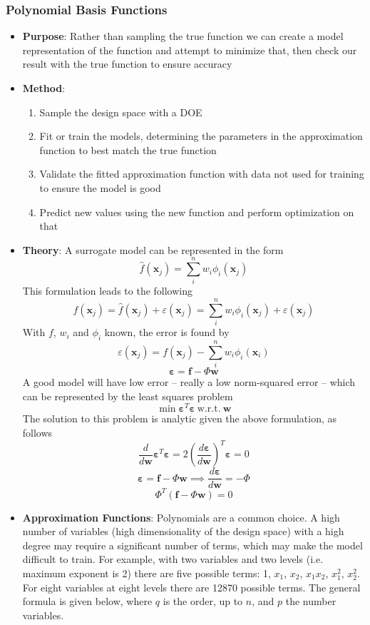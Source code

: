 \documentclass[12pt]{article}
\newcommand{\Item}[1]{\item \textbf{#1}:}
\newcommand{\CenteredBoxed}[1]{\begin{center}\boxed{#1}\end{center}}
\newcommand{\sumlim}[2]{\sum\limits_{#1}^{#2}}
\newcommand{\boldx}{\mathbf{x}}
\begin{document}
\subsubsection{Polynomial Basis Functions}
\begin{itemize}
\Item{Purpose} Rather than sampling the true function we can create a model representation of the function and attempt to minimize that, then check our result with the true function to ensure accuracy
\Item{Method}
	\begin{enumerate}
	\item Sample the design space with a DOE
	\item Fit or train the models, determining the parameters in the approximation function to best match the true function
	\item Validate the fitted approximation function with data not used for training to ensure the model is good
	\item Predict new values using the new function and perform optimization on that
	\end{enumerate}
\Item{Theory} A surrogate model can be represented in the form
$$\hat{f}(\boldx_j)=\sumlim{i}{n}w_i\phi_i(\boldx_j)$$
This formulation leads to the following
$$f(\boldx_j) = \hat{f}(\boldx_j) + \varepsilon(\boldx_j) = \sumlim{i}{n}w_i\phi_i(\boldx_j) + \varepsilon(\boldx_j)$$
With $f$, $w_i$ and $\phi_i$ known, the error is found by
$$\varepsilon(\boldx_j)=f(\boldx_j)-\sumlim{i}{n}w_i\phi_i(\boldx_i)$$
$$\bm{\varepsilon}=\bm{f}-\Phi\bm{w}$$
A good model will have low error -- really a low norm-squared error -- which can be represented by the least squares problem
$$\min\bm{\varepsilon}^T\bm{\varepsilon}\ \mathrm{w.r.t.}\ \bm{w}$$
The solution to this problem is analytic given the above formulation, as follows
$$\frac{d}{d\bm{w}}\bm{\varepsilon}^T\bm{\varepsilon} = 2\left(\frac{d\bm{\varepsilon}}{d\bm{w}}\right)^T\bm{\varepsilon}=0$$
$$\bm{\varepsilon}=\bm{f}-\Phi\bm{w}\implies \frac{d\bm{\varepsilon}}{d\bm{w}}=-\Phi$$
$$\Phi^T(\bm{f}-\Phi\bm{w})=0$$
\CenteredBoxed{\bm{w}=\left(\Phi^T\Phi\right)^{-1}\Phi^T\bm{f}}
\Item{Approximation Functions} Polynomials are a common choice. A high number of variables (high dimensionality of the design space) with a high degree may require a significant number of terms, which may make the model difficult to train. For example, with two variables and two levels (i.e. maximum exponent is 2) there are five possible terms: 1, $x_1$, $x_2$, $x_1x_2$, $x_1^2$, $x_2^2$. For eight variables at eight levels there are 12870 possible terms. The general formula is given below, where $q$ is the order, up to $n$, and $p$ the number variables.

\end{itemize}
\end{document}
